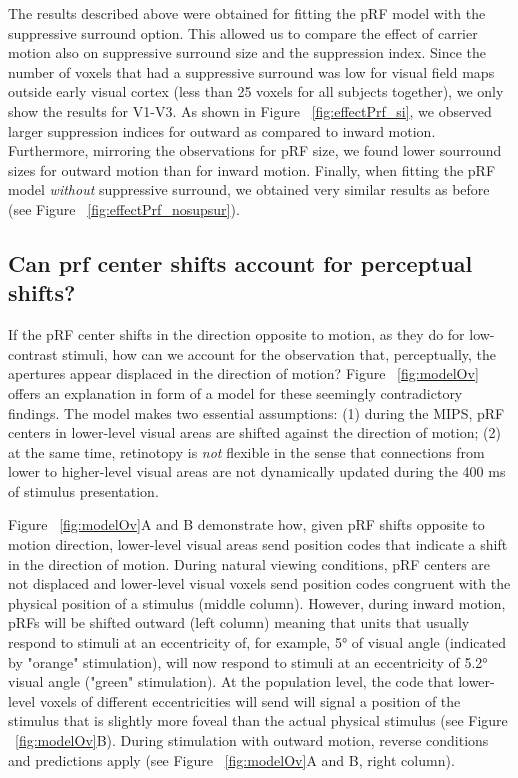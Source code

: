 The results described above were obtained for fitting the pRF model with the suppressive surround option. This allowed us to compare the effect of carrier motion also on suppressive surround size and the suppression index. Since the number of voxels that had a suppressive surround was low for visual field maps outside early visual cortex (less than 25 voxels for all subjects together), we only show the results for V1-V3. As shown in Figure ~\ref{fig:effectPrf_si}, we observed larger suppression indices for outward as compared to inward motion. Furthermore, mirroring the observations for pRF size, we found lower sourround sizes for outward motion than for inward motion. Finally, when fitting the pRF model \textit{without} suppressive surround, we obtained very similar results as before (see Figure ~\ref{fig:effectPrf_nosupsur}).

\subsection{Can prf center shifts account for perceptual shifts?}
If the pRF center shifts in the direction opposite to motion, as they do for low-contrast stimuli, how can we account for the observation that, perceptually, the apertures appear displaced in the direction of motion? Figure ~\ref{fig:modelOv} offers an explanation in form of a model for these seemingly contradictory findings. The model makes two essential assumptions: (1) during the MIPS, pRF centers in lower-level visual areas are shifted against the direction of motion; (2) at the same time, retinotopy is \textit{not} flexible in the sense that connections from lower to higher-level visual areas are not dynamically updated during the 400 ms of stimulus presentation.

Figure ~\ref{fig:modelOv}A and B demonstrate how, given pRF shifts opposite to motion direction, lower-level visual areas send position codes that indicate a shift in the direction of motion. During natural viewing conditions, pRF centers are not displaced and lower-level visual voxels send position codes congruent with the physical position of a stimulus (middle column). However, during inward motion, pRFs will be shifted outward (left column) meaning that units that usually respond to stimuli at an eccentricity of, for example, 5° of visual angle (indicated by "orange" stimulation), will now respond to stimuli at an eccentricity of 5.2° visual angle ("green" stimulation). At the population level, the code that lower-level voxels of different eccentricities will send will signal a position of the stimulus that is slightly more foveal than the actual physical stimulus (see Figure ~\ref{fig:modelOv}B). During stimulation with outward motion, reverse conditions and predictions apply (see Figure ~\ref{fig:modelOv}A and B, right column).

